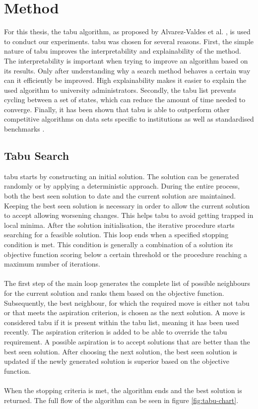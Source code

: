 
\section{Method}\label{sec:method}
For this thesis, the \acrlong{tabu} algorithm, as proposed by Alvarez-Valdes et al. \cite{alvarez1997}, is used to conduct our experiments. \acrshort{tabu} was chosen for several reasons. First, the simple nature of \acrshort{tabu} improves the interpretability and explainability of the method. The interpretability is important when trying to improve an algorithm based on its results. Only after understanding why a search method behaves a certain way can it efficiently be improved. High explainability makes it easier to explain the used algorithm to university administrators. Secondly, the tabu list prevents cycling between a set of states, which can reduce the amount of time needed to converge. Finally, it has been shown that \acrlong{tabu} is able to outperform other competitive algorithms  on data sets specific to institutions \cite{alvarez1997} \cite{colorni1999} \cite{Chu2000} as well as standardised benchmarks \cite{gaspero2001}.  

\subsection{Tabu Search}

 \acrfull{tabu}\cite{glover1993} starts by constructing an initial solution. The solution can be generated randomly or by applying a deterministic approach. During the entire process, both the best seen solution to date and the current solution are maintained. Keeping the best seen solution is necessary in order to allow the current solution to accept allowing worsening changes. This helps \acrshort{tabu} to avoid getting trapped in local minima. After the solution initialisation, the iterative procedure starts searching for a feasible solution. This loop ends when  a specified stopping condition is met. This condition is generally a combination of a solution its objective function scoring below a certain threshold or the procedure reaching a maximum number of iterations.
\\\\
The first step of the main loop generates the complete list of possible neighbours for the current solution and ranks them based on the objective function. Subsequently, the best neighbour, for which the required move is either not tabu or that meets the aspiration criterion, is chosen as the next solution. A move is considered tabu if it is present within the tabu list, meaning it has been used recently. The aspiration criterion is added to be able to override the tabu requirement. A possible aspiration is to accept solutions that are better than the best seen solution. After choosing the next solution, the best seen solution is updated if the newly generated solution is superior based on the objective function.
\\\\
When the stopping criteria is met, the algorithm ends and the best solution is returned. The full flow of the algorithm can be seen in figure \ref{fig:tabu-chart}.

